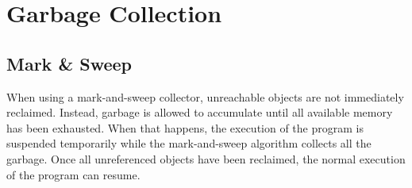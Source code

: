 \documentclass{article}
\newcommand{\todo}[1]{}
\newcommand{\comment}[1]{}%
\begin{document}
\comment{
\todo {generalize this, style it for Nasal and then emit it directly via the interpreter}
\begin{drawstack}
  \startframe
  \cell{First cell}
  \cell{Second cell}
  \finishframe{Some stack frame}
  \cell{Not interesting}
  \startframe
  \cell{Next stack frame}
  \cell{Next stack frame}
  \finishframe{Another stack frame}
\end{drawstack}

\begin{enumerate}
  \item \url{http://stackoverflow.com/questions/10057443/explain-the-concept-of-a-stack-frame-in-a-nutshell}
  \item \url{http://www.cs.umd.edu/class/sum2003/cmsc311/Notes/Mips/stack.html}
  \item \url{http://en.wikibooks.org/wiki/X86_Disassembly/Functions_and_Stack_Frames}
  \item \url{http://en.wikipedia.org/wiki/Stack_frame#Structure}
  \item \url{http://www.dirac.org/linux/gdb/02a-Memory_Layout_And_The_Stack.php}
  \item \url{http://blog.morrisjohns.com/javascript_closures_for_dummies.html}
  \item \url {http://mark-story.com/posts/view/picking-up-javascript-closures-and-lexical-scoping}
\end{enumerate}
}

\todo{we can inspect stack frames using helpers in findFrame(), see naGetSourceFile() and naGetLine() for examples}

\section{Garbage Collection}
\subsection{Mark \& Sweep}
When using a mark-and-sweep collector, unreachable objects are not immediately reclaimed.  Instead, garbage is allowed to accumulate until all available memory has been exhausted.  When that happens, the execution of the program is suspended temporarily while the mark-and-sweep algorithm collects all the garbage.  Once all unreferenced objects have been reclaimed, the normal execution of the program can resume.
\end{document}
